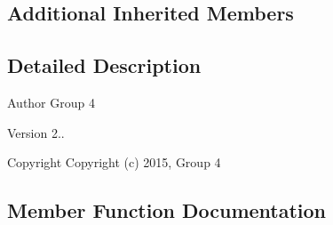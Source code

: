 \subsection*{Additional Inherited Members}


\subsection{Detailed Description}
\begin{DoxyAuthor}{Author}
Group 4 
\end{DoxyAuthor}
\begin{DoxyVersion}{Version}
2.. 
\end{DoxyVersion}
\begin{DoxyCopyright}{Copyright}
Copyright (c) 2015, Group 4 
\end{DoxyCopyright}


\subsection{Member Function Documentation}
\hypertarget{classclinic__task_a9a390919bc9e593044b5836f4a2e5264}{}
